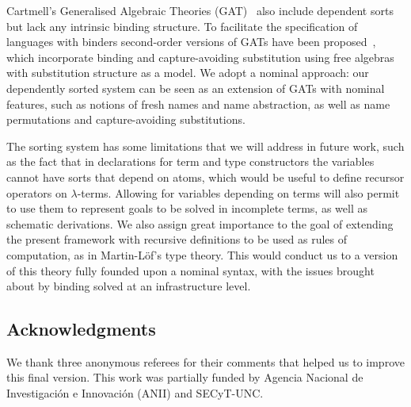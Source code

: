 \documentclass[copyright,creativecommons]{eptcs}
\newcounter{s}
\begin{document}
Cartmell's Generalised Algebraic Theories (GAT)~\cite{Cartmell86,SterlingJ:algttu} also include dependent sorts but lack any intrinsic binding structure. 
To facilitate the specification of languages with binders  second-order versions of GATs have been proposed~\cite{Fiore08,UemuraPhD,KaposiX24}, which incorporate binding and capture-avoiding substitution using free algebras with substitution structure as a model. We adopt a nominal approach: our dependently sorted system can be seen as an extension of GATs with nominal features, such as notions of fresh names and name abstraction, as well as name permutations and capture-avoiding substitutions. 

The sorting system has some limitations that we will address in future work, such as the fact that in declarations for term and type constructors the variables cannot have sorts that depend on atoms, which would be useful to define recursor operators  on $\lambda$-terms. Allowing for variables depending on terms will also permit to use them to 
represent goals to be solved in incomplete terms, as well as schematic derivations.
We also assign great importance to the goal of extending the present framework with recursive definitions to be used as rules of computation, as in Martin-L\"of's type theory. This would conduct us to a version of this theory fully founded upon a nominal syntax, with the issues brought about by binding solved at an infrastructure level.

\subsection*{Acknowledgments} We thank three anonymous referees for their
comments that helped us to improve this final version. This work was partially
funded by Agencia Nacional de Investigación e Innovación (ANII) and SECyT-UNC.



\end{document}
